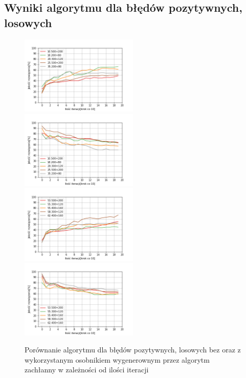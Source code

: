 \documentclass{article}
\begin{document}
\subsection{Wyniki algorytmu dla błędów pozytywnych, losowych}
\begin{figure}[H]
\includegraphics[width=0.5\textwidth]{poz-los1.png}
\includegraphics[width=0.5\textwidth]{poz-los-greedy1.png}
\includegraphics[width=0.5\textwidth]{poz-los2.png}
\includegraphics[width=0.5\textwidth]{poz-los-greedy2.png}
\caption{Porównanie algorytmu dla błędów pozytywnych, losowych bez oraz z wykorzystanym osobnikiem wygenerownym przez algorytm zachłanny w zależności od ilości iteracji}
\end{figure}
\end{document}
